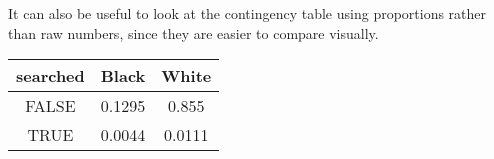 \documentclass[]{book}
\newenvironment{Shaded}{\begin{snugshade}}{\end{snugshade}}
\newcommand{\KeywordTok}[1]{\textcolor[rgb]{0.13,0.29,0.53}{\textbf{#1}}}
\newcommand{\DataTypeTok}[1]{\textcolor[rgb]{0.13,0.29,0.53}{#1}}
\newcommand{\DecValTok}[1]{\textcolor[rgb]{0.00,0.00,0.81}{#1}}
\newcommand{\StringTok}[1]{\textcolor[rgb]{0.31,0.60,0.02}{#1}}
\newcommand{\CommentTok}[1]{\textcolor[rgb]{0.56,0.35,0.01}{\textit{#1}}}
\newcommand{\OperatorTok}[1]{\textcolor[rgb]{0.81,0.36,0.00}{\textbf{#1}}}
\newcommand{\NormalTok}[1]{#1}
\theoremstyle{definition}
\theoremstyle{definition}
\theoremstyle{definition}
\theoremstyle{remark}
\begin{document}
It can also be useful to look at the contingency table using proportions
rather than raw numbers, since they are easier to compare visually.

\begin{Shaded}
\end{Shaded}

\begin{longtable}[]{@{}ccc@{}}
\toprule
\begin{minipage}[b]{0.14\columnwidth}\centering\strut
searched\strut
\end{minipage} & \begin{minipage}[b]{0.11\columnwidth}\centering\strut
Black\strut
\end{minipage} & \begin{minipage}[b]{0.11\columnwidth}\centering\strut
White\strut
\end{minipage}\tabularnewline
\midrule
\endhead
\begin{minipage}[t]{0.14\columnwidth}\centering\strut
FALSE\strut
\end{minipage} & \begin{minipage}[t]{0.11\columnwidth}\centering\strut
0.1295\strut
\end{minipage} & \begin{minipage}[t]{0.11\columnwidth}\centering\strut
0.855\strut
\end{minipage}\tabularnewline
\begin{minipage}[t]{0.14\columnwidth}\centering\strut
TRUE\strut
\end{minipage} & \begin{minipage}[t]{0.11\columnwidth}\centering\strut
0.0044\strut
\end{minipage} & \begin{minipage}[t]{0.11\columnwidth}\centering\strut
0.0111\strut
\end{minipage}\tabularnewline
\bottomrule
\end{longtable}
\end{document}
